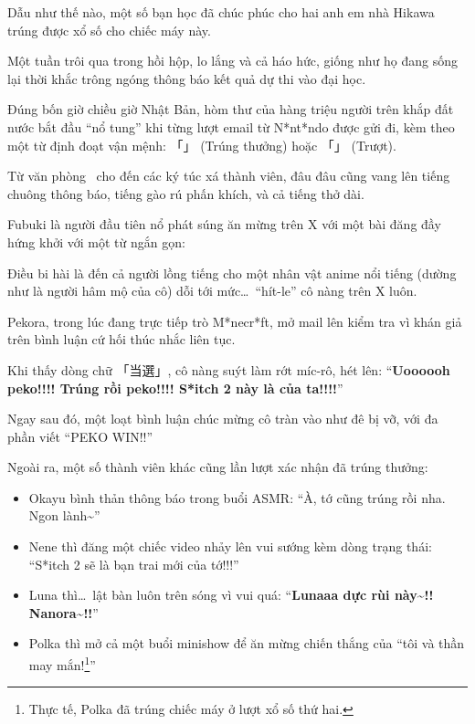\documentclass[../main.tex]{subfiles}
\begin{document}
Dẫu như thế nào, một số bạn học đã chúc phúc cho hai anh em nhà Hikawa trúng được xổ số cho chiếc máy này.

\ct

Một tuần trôi qua trong hồi hộp, lo lắng và cả háo hức, giống như họ đang sống lại thời khắc trông ngóng thông báo kết quả dự thi vào đại học.

Đúng bốn giờ chiều giờ Nhật Bản, hòm thư của hàng triệu người trên khắp đất nước bắt đầu ``nổ tung'' khi từng lượt email từ N*nt*ndo được gửi đi, kèm theo một từ định đoạt vận mệnh: 「」 (Trúng thưởng) hoặc 「」 (Trượt).

Từ văn phòng \hll\ cho đến các ký túc xá thành viên, đâu đâu cũng vang lên tiếng chuông thông báo, tiếng gào rú phấn khích, và cả tiếng thở dài.

\il

Fubuki là người đầu tiên nổ phát súng ăn mừng trên X với một bài đăng đầy hứng khởi với một từ ngắn gọn:


Điều bi hài là đến cả người lồng tiếng cho một nhân vật anime nổi tiếng (dường như là người hâm mộ của cô) dỗi tới mức\dots\ ``hít-le'' cô nàng trên X luôn.

Pekora, trong lúc đang trực tiếp trò M*necr*ft, mở mail lên kiểm tra vì khán giả trên bình luận cứ hối thúc nhắc liên tục.

Khi thấy dòng chữ 「当選」, cô nàng suýt làm rớt míc-rô, hét lên: ``\textbf{Uoooooh peko!!!! Trúng rồi peko!!!! S*itch 2 này là của ta!!!!}''

Ngay sau đó, một loạt bình luận chúc mừng cô tràn vào như đê bị vỡ, với đa phần viết ``PEKO WIN!!''

Ngoài ra, một số thành viên khác cũng lần lượt xác nhận đã trúng thưởng:

\begin{itemize}
    \item Okayu bình thản thông báo trong buổi ASMR: ``À, tớ cũng trúng rồi nha. Ngon lành\~{}''
    \item Nene thì đăng một chiếc video nhảy lên vui sướng kèm dòng trạng thái: ``S*itch 2 sẽ là bạn trai mới của tớ!!!''
    \item Luna thì\dots\ lật bàn luôn trên sóng vì vui quá: ``\textbf{Lunaaa dực rùi này\~{}!! Nanora\~{}!!}''
    \item Polka thì mở cả một buổi minishow để ăn mừng chiến thắng của ``tôi và thần may mắn!\footnote{Thực tế, Polka đã trúng chiếc máy ở lượt xổ số thứ hai.}''
\end{itemize}
\end{document}
